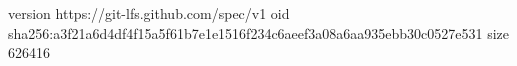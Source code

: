 version https://git-lfs.github.com/spec/v1
oid sha256:a3f21a6d4df4f15a5f61b7e1e1516f234c6aeef3a08a6aa935ebb30c0527e531
size 626416
